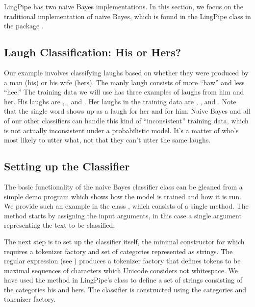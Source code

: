 LingPipe has two naive Bayes implementations.  In this section, we
focus on the traditional implementation of naive Bayes, which is found
in the LingPipe class  in the package
.  

\subsection{Laugh Classification: His or Hers?}

Our example involves classifying laughs based on whether they were
produced by a man (his) or his wife (hers).  The manly laugh consists
of more ``haw'' and less ``hee.''  The training data we will use has
three examples of laughs from him and her.  His laughs are
, , and
.  Her laughs in the training data are
, , and
.  Note that the single word 
shows up as a laugh for her and for him.  Naive Bayes and all of our
other classifiers can handle this kind of ``inconsistent'' training
data, which is not actually inconsistent under a probabilistic model.
It's a matter of who's most likely to utter what, not that they
can't utter the same laughs.

\subsection{Setting up the Classifier}

The basic functionality of the naive Bayes classifier class can be
gleaned from a simple demo program which shows how the model is
trained and how it is run.  We provide such an example in the class
, which consists of a single  method.
The method starts by assigning the input arguments, in this case
a single argument representing the text to be classified.
%

The next step is to set up the classifier itself, the
minimal constructor for which requires a tokenizer factory
and set of categories represented as strings.
%
%
The regular expression  (see
) produces a tokenizer factory that
defines tokens to be maximal sequences of characters which Unicode
considers not whitespace.  We have used the  method in
LingPipe's  class to define a set of strings
consisting of the categories his and hers.  The classifier is
constructed using the categories and tokenizer factory.


